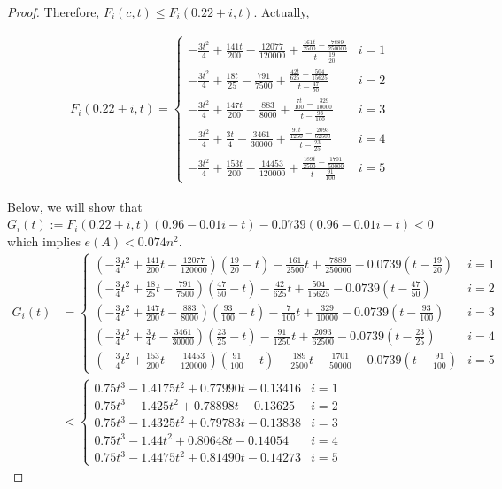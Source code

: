 \documentclass[11pt, oneside]{article}   	%
\begin{document}
\begin{proof}
Therefore, $F_i(c,t)\leq F_i(0.22+i,t)$. Actually,

\begin{align}
F_i(0.22+i,t)=
\begin{cases}
-\frac{3t^2 }{4}+\frac{141t}{200}-\frac{12077}{120000}+ \frac{\frac{161t}{2500}-\frac{7889}{250000}}{t-\frac{19}{20}} 
& i=1\\
-\frac{3t^2 }{4}+\frac{18t}{25}-\frac{791}{7500}+\frac{\frac{42t}{625}-\frac{504}{15625}}{t-\frac{47}{50}} 
& i=2\\
-\frac{3t^2 }{4}+\frac{147t}{200}-\frac{883}{8000}+\frac{\frac{7t}{100}-\frac{329}{10000}}{t-\frac{93}{100}}
& i=3\\
-\frac{3t^2 }{4}+\frac{3t}{4}-\frac{3461}{30000}+\frac{\frac{91t}{1250}-\frac{2093}{62500}}{t-\frac{23}{25}}
& i=4\\
-\frac{3t^2 }{4}+\frac{153t}{200}-\frac{14453}{120000}+\frac{\frac{189t}{2500}-\frac{1701}{50000}}{t-\frac{91}{100}}
& i=5
\end{cases}    
\end{align}


Below, we will show that $G_i(t):=F_i(0.22+i,t)(0.96-0.01i-t)-0.0739(0.96-0.01i-t)<0$ which implies $e(A) <0.074 n^2$. 
\begin{align}
    G_i(t) &= 
\begin{cases} 
\left(-\frac{3}{4}t^2 + \frac{141}{200}t - \frac{12077}{120000}\right) \left(\frac{19}{20} - t\right) - \frac{161}{2500}t + \frac{7889}{250000} - 0.0739 \left(t - \frac{19}{20}\right) & i = 1 \\
\left(-\frac{3}{4}t^2 + \frac{18}{25}t - \frac{791}{7500}\right) \left(\frac
 {47}{50} - t\right) - \frac{42}{625}t + \frac{504}{15625} - 0.0739 \left(t - \frac{47}{50}\right) & i = 2 \\
\left(-\frac{3}{4}t^2 + \frac{147}{200}t - \frac{883}{8000}\right) \left(\frac{93}{100} - t\right) - \frac{7}{100}t + \frac{329}{10000} - 0.0739 \left(t - \frac{93}{100}\right) & i = 3 \\
\left(-\frac{3}{4}t^2 + \frac{3}{4}t - \frac{3461}{30000}\right) \left(\frac{23}{25} - t\right) - \frac{91}{1250}t + \frac{2093}{62500} - 0.0739 \left(t - \frac{23}{25}\right) & i = 4 \\
\left(-\frac{3}{4}t^2 + \frac{153}{200}t - \frac{14453}{120000}\right) \left(\frac{91}{100} - t\right) - \frac{189}{2500}t + \frac{1701}{50000} - 0.0739 \left(t - \frac{91}{100}\right) & i = 5 
\end{cases}\\
&< \begin{cases}
0.75 t^3 - 1.4175 t^2 + 0.77990 t - 0.13416 & i = 1 \\
0.75 t^3 - 1.425 t^2 + 0.78898 t - 0.13625 & i = 2 \\
0.75 t^3 - 1.4325 t^2 + 0.79783 t - 0.13838 & i = 3 \\
0.75 t^3 - 1.44 t^2 + 0.80648 t - 0.14054 & i = 4 \\
0.75 t^3 - 1.4475 t^2 + 0.81490 t - 0.14273 & i = 5
\end{cases}
\end{align}


\end{proof}
\end{document}
